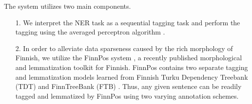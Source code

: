 \documentclass[11pt]{article}
\begin{document}
The system utilizes two main components.

\begin{itemize}

\item[1.] We interpret the NER task as a sequential tagging task and perform the tagging using the averaged perceptron algorithm \citep{collins2002}.

\item[2.] In order to alleviate data sparseness caused by the rich morphology of Finnish, we utilize the FinnPos system \citep{silfverberg2016}, a recently published morphological and lemmatization toolkit for Finnish. FinnPos contains two separate tagging and lemmatization models learned from Finnish Turku Dependency Treebank (TDT) \citep{haverinen2014} and FinnTreeBank (FTB) \citep{voutilainen2011}. Thus, any given sentence can be readily tagged and lemmatized by FinnPos using two varying annotation schemes.


 \end{itemize}

%
%
\end{document}
